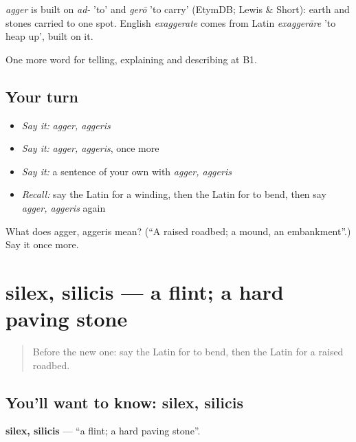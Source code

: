 \begin{cousinweb}
\emph{agger} is built on \emph{ad-} 'to' and \emph{gerō} 'to carry' (EtymDB; Lewis \& Short): earth and stones carried to one spot. English \emph{exaggerate} comes from Latin \emph{exaggerāre} 'to heap up', built on it.
\end{cousinweb}

\begin{grammarlens}[title={What you've built}]
One more word for telling, explaining and describing at B1.
\end{grammarlens}

\subsection*{Your turn}
\begin{itemize}
\raggedright
  \item \emph{Say it:} \emph{agger, aggeris}
  \item \emph{Say it:} \emph{agger, aggeris}, once more
  \item \emph{Say it:} a sentence of your own with \emph{agger, aggeris}
  \item \emph{Recall:} say the Latin for a winding, then the Latin for to bend, then say \emph{agger, aggeris} again
\end{itemize}

\begin{tcolorbox}[breakable,colback=teal!4,colframe=teal!35!black,title={Before you move on}]
What does agger, aggeris mean? (\textquotedblleft{}A raised roadbed; a mound, an embankment\textquotedblright{}.) Say it once more.
\end{tcolorbox}
\section[silex, silicis]{silex, silicis — a flint; a hard paving stone}

\label{lesson:LA-C425-silex}



\begin{quote}
Before the new one: say the Latin for to bend, then the Latin for a raised roadbed.
\end{quote}

\subsection*{You'll want to know: silex, silicis}
\textbf{silex, silicis} — \textquotedblleft{}a flint; a hard paving stone\textquotedblright{}.

